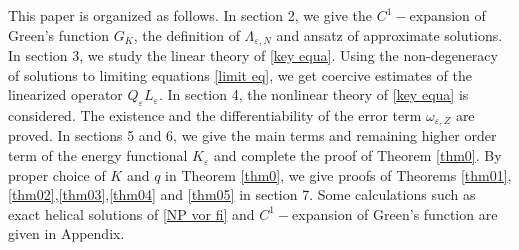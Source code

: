 \documentclass[12pt,reqno]{amsart}
\numberwithin{equation}{section}
\theoremstyle{definition}
\theoremstyle{remark}
\newtheorem{remark}[theorem]{Remark}
\begin{document}
%


This paper is organized as follows.  %
In section 2, we give the $ C^1- $expansion of Green's function $ G_K $, the definition of   $ \Lambda_{\varepsilon, N} $ and ansatz of approximate solutions. In section 3, we study the linear theory of \eqref{key equa}. Using the non-degeneracy of solutions to limiting equations \eqref{limit eq}, we get coercive estimates of the linearized operator $ Q_\varepsilon L_\varepsilon $. In section 4, the nonlinear theory of \eqref{key equa} is considered. The existence and  the differentiability of the error term $ \omega_{\varepsilon,Z} $   are proved.
In sections 5 and 6, we give the main terms and remaining higher order term of the energy functional $ K_\varepsilon  $ and   complete the proof of Theorem \ref{thm0}. By proper choice of $ K $ and $ q $ in Theorem \ref{thm0}, we give proofs of  Theorems \ref{thm01},\ref{thm02},\ref{thm03},\ref{thm04} and \ref{thm05} in section 7. Some calculations such as  exact helical solutions of \eqref{NP vor fi} and $ C^1-$expansion of Green’s function are given in Appendix.
\end{document}
